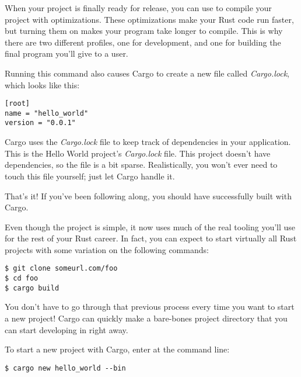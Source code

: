 
When your project is finally ready for release, you can use  to compile your project with optimizations. 
These optimizations make your Rust code run faster, but turning them on makes your program take longer to compile. This is why 
there are two different profiles, one for development, and one for building the final program you’ll give to a user.

\blank

Running this command also causes Cargo to create a new file called \emph{Cargo.lock}, which looks like this:

\begin{verbatim}
[root]
name = "hello_world"
version = "0.0.1"
\end{verbatim}

Cargo uses the \emph{Cargo.lock} file to keep track of dependencies in your application. This is the Hello World project's 
\emph{Cargo.lock} file. This project doesn't have dependencies, so the file is a bit sparse. Realistically, you won't ever 
need to touch this file yourself; just let Cargo handle it.

\blank

That’s it! If you've been following along, you should have successfully built  with Cargo.

\blank

Even though the project is simple, it now uses much of the real tooling you’ll use for the rest of your Rust career. 
In fact, you can expect to start virtually all Rust projects with some variation on the following commands:

\begin{verbatim}
$ git clone someurl.com/foo
$ cd foo
$ cargo build 
\end{verbatim}


You don’t have to go through that previous process every time you want to start a new project! Cargo can quickly make a 
bare-bones project directory that you can start developing in right away.

\blank

To start a new project with Cargo, enter  at the command line:

\begin{verbatim}
$ cargo new hello_world --bin
\end{verbatim}

